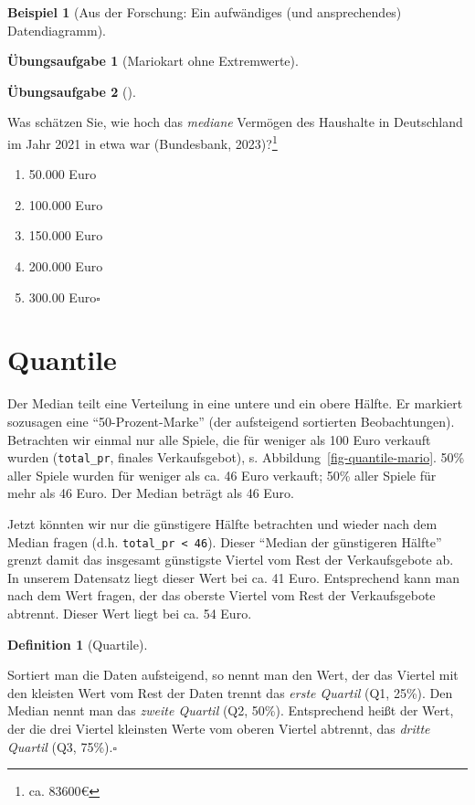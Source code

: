 \documentclass[
  a4paper,
]{scrbook}
\providecommand{\tightlist}{%
  \setlength{\itemsep}{0pt}\setlength{\parskip}{0pt}}\usepackage{longtable,booktabs,array}
\theoremstyle{definition}
\newtheorem{example}{Beispiel}[chapter]
\theoremstyle{definition}
\newtheorem{definition}{Definition}[chapter]
\theoremstyle{definition}
\newtheorem{exercise}{Übungsaufgabe}[chapter]
\theoremstyle{remark}
\begin{document}
\begin{example}[Aus der Forschung: Ein aufwändiges (und ansprechendes)
Datendiagramm]
\begin{exercise}[Mariokart ohne
Extremwerte]
\end{exercise}

\begin{exercise}[]\protect\hypertarget{exr-mw-wealthmd}{}\label{exr-mw-wealthmd}

Was schätzen Sie, wie hoch das \emph{mediane} Vermögen des Haushalte in
Deutschland im Jahr 2021 in etwa war (Bundesbank, 2023)?\footnote{ca.
  83600€}

\begin{enumerate}
\def\labelenumi{\alph{enumi})}
\tightlist
\item
  50.000 Euro
\item
  100.000 Euro
\item
  150.000 Euro
\item
  200.000 Euro
\item
  300.00 Euro\(\square\)
\end{enumerate}

\end{exercise}

\section{Quantile}\label{quantile}

Der Median teilt eine Verteilung in eine untere und ein obere Hälfte. Er
markiert sozusagen eine ``50-Prozent-Marke'' (der aufsteigend sortierten
Beobachtungen). Betrachten wir einmal nur alle Spiele, die für weniger
als 100 Euro verkauft wurden (\texttt{total\_pr}, finales
Verkaufsgebot), s. Abbildung~\ref{fig-quantile-mario}. 50\% aller Spiele
wurden für weniger als ca. 46 Euro verkauft; 50\% aller Spiele für mehr
als 46 Euro. Der Median beträgt als 46 Euro.

Jetzt könnten wir nur die günstigere Hälfte betrachten und wieder nach
dem Median fragen (d.h. \texttt{total\_pr\ \textless{}\ 46}). Dieser
``Median der günstigeren Hälfte'' grenzt damit das insgesamt günstigste
Viertel vom Rest der Verkaufsgebote ab. In unserem Datensatz liegt
dieser Wert bei ca. 41 Euro. Entsprechend kann man nach dem Wert fragen,
der das oberste Viertel vom Rest der Verkaufsgebote abtrennt. Dieser
Wert liegt bei ca. 54 Euro.

\begin{definition}[Quartile]\protect\hypertarget{def-quartile}{}\label{def-quartile}

Sortiert man die Daten aufsteigend, so nennt man den Wert, der das
Viertel mit den kleisten Wert vom Rest der Daten trennt das \emph{erste
Quartil} (Q1, 25\%). Den Median nennt man das \emph{zweite Quartil} (Q2,
50\%). Entsprechend heißt der Wert, der die drei Viertel kleinsten Werte
vom oberen Viertel abtrennt, das \emph{dritte Quartil} (Q3,
75\%).\(\square\)


\end{definition}
\end{example}
\end{document}
